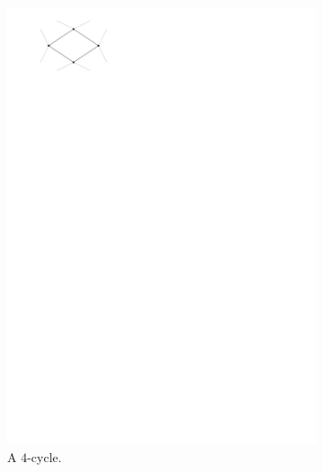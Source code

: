   \begin{figure}
      \centering
      \begin{subfigure}[t]{2cm}
          \includegraphics[width = \textwidth]{introduction/img/4cycle.pdf}
          \caption{A $4$-cycle.}
      \end{subfigure}
      ~
      \begin{subfigure}[t]{2cm}

\end{subfigure}
\end{figure}
